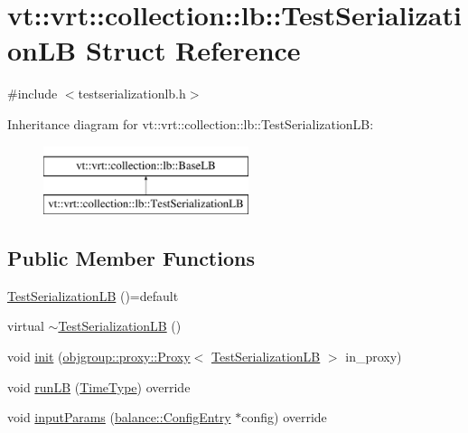 \hypertarget{structvt_1_1vrt_1_1collection_1_1lb_1_1_test_serialization_l_b}{}\section{vt\+:\+:vrt\+:\+:collection\+:\+:lb\+:\+:Test\+Serialization\+LB Struct Reference}
\label{structvt_1_1vrt_1_1collection_1_1lb_1_1_test_serialization_l_b}


{\ttfamily \#include $<$testserializationlb.\+h$>$}

Inheritance diagram for vt\+:\+:vrt\+:\+:collection\+:\+:lb\+:\+:Test\+Serialization\+LB\+:\begin{figure}[H]
\begin{center}
\leavevmode
\includegraphics[height=2.000000cm]{structvt_1_1vrt_1_1collection_1_1lb_1_1_test_serialization_l_b}
\end{center}
\end{figure}
\subsection*{Public Member Functions}
\begin{DoxyCompactItemize}
\item 
\hyperlink{structvt_1_1vrt_1_1collection_1_1lb_1_1_test_serialization_l_b_ae484c610a000141d0168d29da8ee8e08}{Test\+Serialization\+LB} ()=default
\item 
virtual \hyperlink{structvt_1_1vrt_1_1collection_1_1lb_1_1_test_serialization_l_b_aa90398f1c00e00b6cb422e42d8c7860c}{$\sim$\+Test\+Serialization\+LB} ()
\item 
void \hyperlink{structvt_1_1vrt_1_1collection_1_1lb_1_1_test_serialization_l_b_ac19e5c9f52661444430932018eadce68}{init} (\hyperlink{structvt_1_1objgroup_1_1proxy_1_1_proxy}{objgroup\+::proxy\+::\+Proxy}$<$ \hyperlink{structvt_1_1vrt_1_1collection_1_1lb_1_1_test_serialization_l_b}{Test\+Serialization\+LB} $>$ in\+\_\+proxy)
\item 
void \hyperlink{structvt_1_1vrt_1_1collection_1_1lb_1_1_test_serialization_l_b_a47b93135928a6f1635d7c71995d4ed11}{run\+LB} (\hyperlink{namespacevt_a876a9d0cd5a952859c72de8a46881442}{Time\+Type}) override
\item 
void \hyperlink{structvt_1_1vrt_1_1collection_1_1lb_1_1_test_serialization_l_b_a6d1150f9af14ef8ab51235eaed94c6bf}{input\+Params} (\hyperlink{structvt_1_1vrt_1_1collection_1_1balance_1_1_config_entry}{balance\+::\+Config\+Entry} $\ast$config) override
\end{DoxyCompactItemize}
